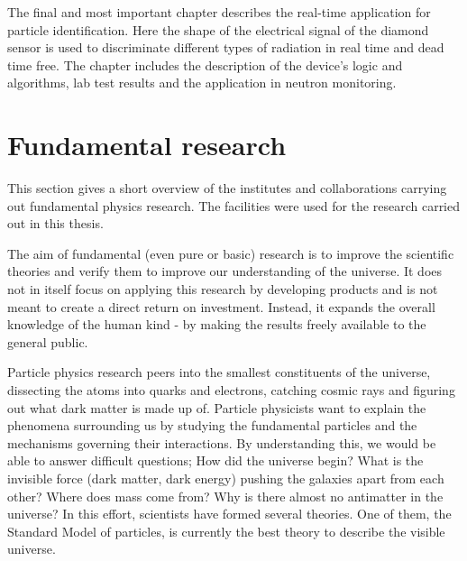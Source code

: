 The final and most important chapter describes the real-time application for particle identification. Here the shape of the electrical signal of the diamond sensor is used to discriminate different types of radiation in real time and dead time free. The chapter includes the description of the device's logic and algorithms, lab test results and the application in neutron monitoring.


 




\clearpage
\section{Fundamental research}
\label{sec:fundphy}
This section gives a short overview of the institutes and collaborations carrying out fundamental physics research. The facilities were used for the research carried out in this thesis. 

The aim of fundamental (even pure or basic) research is to improve the scientific theories and verify them to improve our understanding of the universe.  It does not in itself focus on applying this research by developing products and is not meant to create a direct return on investment. Instead, it expands the overall knowledge of the human kind - by making the results freely available to the general public.

Particle physics research peers into the smallest constituents of the universe, dissecting the atoms into quarks and electrons, catching cosmic rays and figuring out what dark matter is made up of. Particle physicists want to explain the phenomena surrounding us by studying the fundamental particles and the mechanisms governing their interactions. By understanding this, we would be able to answer difficult questions; How did the universe begin? What is the invisible force (dark matter, dark energy) pushing the galaxies apart from each other? Where does mass come from? Why is there almost no antimatter in the universe? In this effort, scientists have formed several theories. One of them, the Standard Model of particles, is currently the best theory to describe the visible universe.

